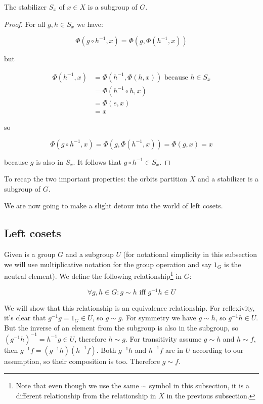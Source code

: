 \begin{thm}\label{stabilizersubgroup}
The stabilizer $S_x$ of $x \in X$ is a subgroup of $G$.
\end{thm}

\begin{proof}
For all $g, h \in S_x$ we have:

$$
\Phi(g \circ h^{-1}, x) = \Phi(g, \Phi(h^{-1}, x))
$$

but 

\begin{align*}
\Phi(h^{-1}, x) &= \Phi(h^{-1}, \Phi(h, x)) \text{ because } h \in S_x\\
                &= \Phi(h^{-1} \circ h, x) \\
                &= \Phi(e, x) \\
                &= x
\end{align*}

so 

$$
\Phi(g \circ h^{-1}, x) = \Phi(g, \Phi(h^{-1}, x)) = \Phi(g, x) = x
$$

because $g$ is also in $S_x$. It follows that $g\circ h^{-1} \in S_x$.

\end{proof}

To recap the two important properties: the orbits partition $X$ and a stabilizer is a subgroup of $G$.

We are now going to make a slight detour into the world of left cosets.

\subsection{Left cosets}

Given is a group $G$ and a subgroup $U$ (for notational simplicity in this subsection we will use multiplicative notation for the group operation and say $1_G$ is the neutral element). We define the following relationship\footnote{Note that even though we use the same $\sim$ symbol in this subsection, it is a different relationship from the relationship in $X$ in the previous subsection.} in $G$:

$$
\forall g, h \in G: g \sim h \text{ iff } g^{-1}h \in U
$$

We will show that this relationship is an equivalence relationship. For reflexivity, it's clear that $g^{-1} g = 1_G \in U$, so $g \sim g$. For symmetry we have $g \sim h$, so $g^{-1}h \in U$. But the inverse of an element from the subgroup is also in the subgroup, so $(g^{-1}h)^{-1} = h^{-1}g \in U$, therefore $h \sim g$. For transitivity assume $g \sim h$ and $h \sim f$, then $g^{-1} f = (g^{-1} h) (h^{-1} f)$. Both $g^{-1} h$ and $h^{-1} f$ are in $U$ according to our assumption, so their composition is too. Therefore $g \sim f$.

